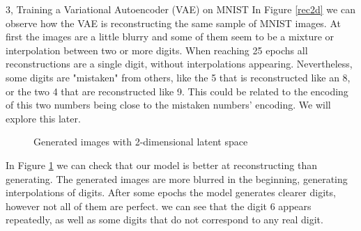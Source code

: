 \begin{task}{3, Training a Variational Autoencoder (VAE) on MNIST}
In Figure \ref{rec2d} we can observe how the VAE is reconstructing the same sample of MNIST images. At first the images are a little blurry and some of them seem to be a mixture or interpolation between two or more digits. When reaching 25 epochs all reconstructions are a single digit, without interpolations appearing. Nevertheless, some digits are "mistaken" from others, like the 5 that is reconstructed like an 8, or the two 4 that are reconstructed like 9. This could be related to the encoding of this two numbers being close to the mistaken numbers' encoding. We will explore this later.

\begin{figure}[H]
    \centering
    \caption{Generated images with 2-dimensional latent space}
    \label{gen2d}
\end{figure}

In Figure \ref{gen2d} we can check that our model is better at reconstructing than generating. The generated images are more blurred in the beginning, generating interpolations of digits. After some epochs the model generates clearer digits, however not all of them are perfect. we can see that the digit 6 appears repeatedly, as well as some digits that do not correspond to any real digit.


\end{task}
